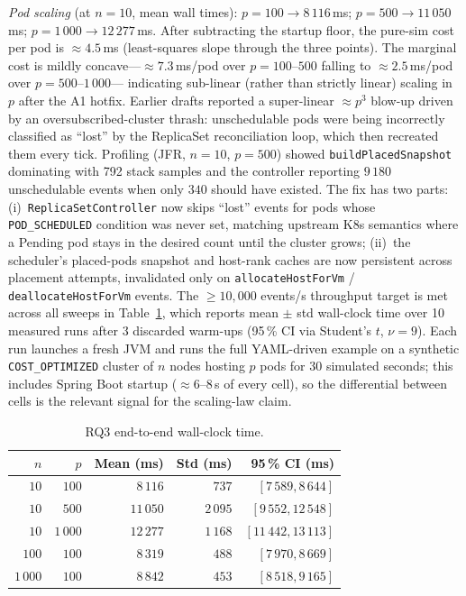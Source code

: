 \documentclass[ASNA,twocolumn]{USG}
\begin{document}
    \emph{Pod scaling} (at $n=10$, mean wall times):
    $p{=}100 \to 8\,116$\,ms; $p{=}500 \to 11\,050$\,ms; $p{=}1\,000 \to
    12\,277$\,ms. After subtracting the startup floor, the pure-sim
    cost per pod is $\approx 4.5$\,ms (least-squares slope through the three
    points). The marginal cost is mildly concave---$\approx 7.3$\,ms/pod over
    $p{=}100$--$500$ falling to $\approx 2.5$\,ms/pod over $p{=}500$--$1\,000$---%
    indicating sub-linear (rather than strictly linear) scaling in $p$ after the
    A1 hotfix.
    Earlier drafts reported a super-linear $\approx p^3$ blow-up driven by
    an oversubscribed-cluster thrash: unschedulable pods were being
    incorrectly classified as ``lost'' by the ReplicaSet reconciliation
    loop, which then recreated them every tick. Profiling (JFR,
    $n{=}10$, $p{=}500$) showed \texttt{buildPlacedSnapshot} dominating
    with 792 stack samples and the controller reporting $9\,180$
    unschedulable events when only $340$ should have existed. The fix
    has two parts:
    (i)~\texttt{ReplicaSetController} now skips ``lost'' events for pods
    whose \texttt{POD\_SCHEDULED} condition was never set, matching
    upstream K8s semantics where a Pending pod stays in the desired count
    until the cluster grows;
    (ii)~the scheduler's placed-pods snapshot and host-rank caches are
    now persistent across placement attempts, invalidated only on
    \texttt{allocateHostForVm} / \texttt{deallocateHostForVm} events. The
    $\geq 10{,}000$ events/s throughput target is met across all sweeps in
    Table~\ref{tab:rq3-scalability}, which reports mean $\pm$ std
    wall-clock time over 10 measured runs after 3 discarded warm-ups
    (95\,\% CI via Student's $t$, $\nu=9$). Each run launches a fresh JVM
    and runs the full YAML-driven example on a synthetic
    \texttt{COST\_OPTIMIZED} cluster of $n$ nodes hosting $p$ pods for
    $30$ simulated seconds; this includes Spring Boot startup ($\approx
    6$--$8$\,s of every cell), so the differential between cells is the
    relevant signal for the scaling-law claim.

    \begin{table}[!t]
        \centering
        \caption{RQ3 end-to-end wall-clock time.
            \label{tab:rq3-scalability}}
        \footnotesize
        \setlength{\tabcolsep}{3pt}
        \begin{tabular*}{\columnwidth}{@{\extracolsep{\fill}}rrrrr@{}}
\toprule
\textbf{$n$} & \textbf{$p$} & \textbf{Mean (ms)} & \textbf{Std (ms)} & \textbf{95\,\% CI (ms)} \\
\midrule
$10$    & $100$   & $8\,116$  & $737$   & $[7\,589, 8\,644]$  \\
$10$    & $500$   & $11\,050$ & $2\,095$& $[9\,552, 12\,548]$ \\
$10$    & $1\,000$& $12\,277$ & $1\,168$& $[11\,442, 13\,113]$\\
$100$   & $100$   & $8\,319$  & $488$   & $[7\,970, 8\,669]$  \\
$1\,000$& $100$   & $8\,842$  & $453$   & $[8\,518, 9\,165]$  \\
\bottomrule
        \end{tabular*}
    \end{table}
\end{document}
